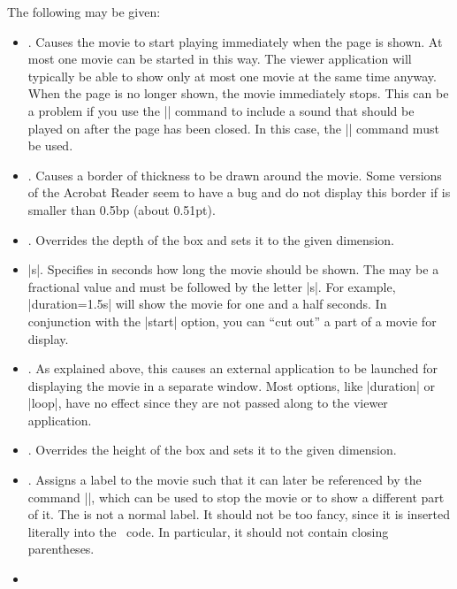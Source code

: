\begin{command}{\movie{}}
  The following  may be given:
  \begin{itemize}
  \item
    . Causes the movie to start playing immediately
    when the page is shown. At most one movie can be started in this
    way. The viewer application will typically be able to show only at
    most one movie at the same time anyway. When the page is no longer
    shown, the movie immediately stops. This can be a problem if you
    use the |\movie| command to include a sound that should be played
    on after the page has been closed. In this case, the |\sound|
    command must be used.
  \item
    . Causes a border of
    thickness  to be drawn around the
    movie. Some versions of the Acrobat Reader seem to have a bug and
    do not display this border if is smaller than 0.5bp (about
    0.51pt).
  \item
    . Overrides the depth of the
     box and sets it to the given dimension.
  \item
    |s|. Specifies in seconds how long
    the movie should be shown. The  may be a fractional
    value and must be followed by the letter |s|. For example,
    |duration=1.5s| will show the movie for one and a half seconds. In
    conjunction with the |start| option, you can ``cut out'' a part of
    a movie for display.
  \item
    . As explained above, this causes an
    external application to be launched for displaying the movie in a
    separate window. Most options, like |duration| or |loop|, have no
    effect since they are not passed along to the viewer application.
  \item
    . Overrides the height of the
     box and sets it to the given dimension.
  \item
    . Assigns a label to the movie
    such that it can later be referenced by the command
    |\hyperlinkmovie|, which can be used to stop the movie or to show
    a different part of it. The  is not a normal
    label. It should not be too fancy, since it is inserted literally
    into the \pdf\ code. In particular, it should not contain closing
    parentheses. 
  \item

\end{itemize}
\end{command}

